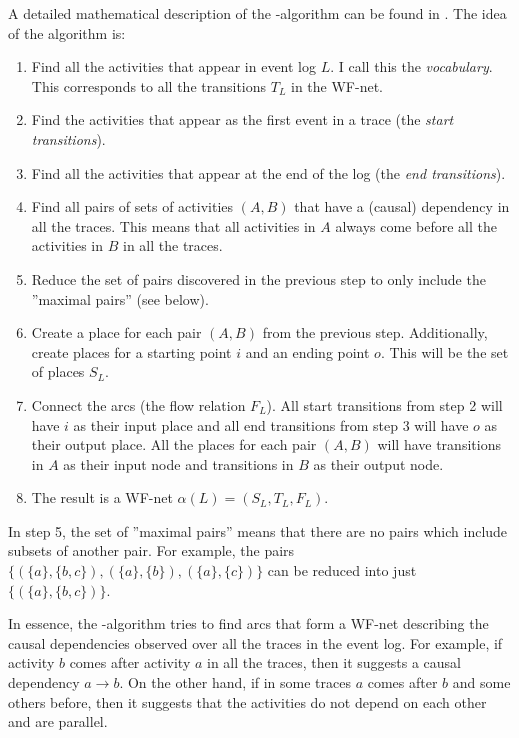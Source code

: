 \documentclass[english,12pt,a4paper,pdftex,sci,utf8]{aaltothesis}
\theoremstyle{definition}
\begin{document}
A detailed mathematical description of the \textalpha-algorithm can be found in \cite{van2004workflow}.
The idea of the algorithm is:

\begin{enumerate}
    \item Find all the activities that appear in event log $L$. I call this the \emph{vocabulary}. This corresponds to all the transitions $T_L$ in the WF-net.
    \item Find the activities that appear as the first event in a trace (the \emph{start transitions}).
    \item Find all the activities that appear at the end of the log (the \emph{end transitions}).
    \item Find all pairs of sets of activities $(A,B)$ that have a (causal) dependency in all the traces. This means that all activities in $A$ always come before all the activities in $B$ in all the traces.
    \item Reduce the set of pairs discovered in the previous step to only include the ''maximal pairs'' (see below). 
    \item Create a place for each pair $(A,B)$ from the previous step. Additionally, create places for a starting point $i$ and an ending point $o$. This will be the set of places $S_L$.
    \item Connect the arcs (the flow relation $F_L$). All start transitions from step 2 will have $i$ as their input place and all end transitions from step 3 will have $o$ as their output place. All the places for each pair $(A,B)$ will have transitions in $A$ as their input node and transitions in $B$ as their output node.
    \item The result is a WF-net $\alpha(L) = ( S_L, T_L, F_L )$.
\end{enumerate}

In step 5, the set of ''maximal pairs'' means that there are no pairs which include subsets of another pair. For example, the pairs $\{(\{a\},\{b,c\}),(\{a\},\{b\}),(\{a\},\{c\})\}$ can be reduced into just $\{(\{a\},\{b,c\})\}$.

In essence, the \textalpha-algorithm tries to find arcs that form a WF-net describing the causal dependencies observed over all the traces in the event log. 
For example, if activity $b$ comes after activity $a$ in all the traces, then it suggests a causal dependency $a \rightarrow b$.
On the other hand, if in some traces $a$ comes after $b$ and some others before, then it suggests that the activities do not depend on each other and are parallel.
\end{document}
